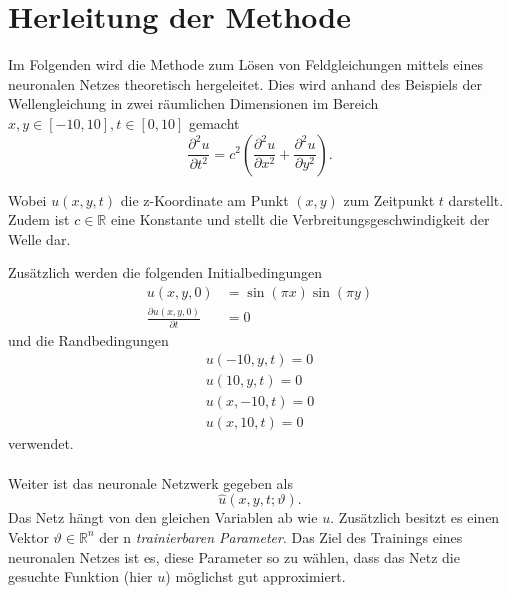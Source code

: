 %
%
%
%

\section{Herleitung der Methode\label{neuronal:section:herleitung}}

Im Folgenden wird die Methode zum Lösen von Feldgleichungen mittels eines neuronalen Netzes theoretisch hergeleitet.
Dies wird anhand des Beispiels der Wellengleichung in zwei räumlichen Dimensionen im Bereich \( x, y \in [-10,10], t \in [0,10] \) gemacht
\begin{equation}
    \frac{\partial^2 u}{\partial t^2} = c^2 \left( \frac{\partial^2 u}{\partial x^2} + \frac{\partial^2 u}{\partial y^2} \right).
    \label{neuronal:wellengleichung}
\end{equation}

Wobei \( u(x, y, t) \) die z-Koordinate am Punkt \( (x, y) \) zum Zeitpunkt \( t \) darstellt. 
Zudem ist \( c \in \mathbb{R} \) eine Konstante und stellt die Verbreitungsgeschwindigkeit der Welle dar.

Zusätzlich werden die folgenden Initialbedingungen
\begin{equation}
    \begin{aligned}
        u(x, y, 0) &= \sin(\pi x) \sin(\pi y)\\
        \frac{\partial u(x, y, 0)}{\partial t} &= 0
    \end{aligned}
    \label{neuronal:initial}
\end{equation}
und die Randbedingungen
\begin{equation}
    \begin{aligned}
        u(-10, y, t) = 0\\
        u(10, y, t) = 0\\
        u(x, -10, t) = 0\\
        u(x, 10, t) = 0
    \end{aligned}
    \label{neuronal:rand}
\end{equation}
verwendet.\\
\\
Weiter ist das neuronale Netzwerk gegeben als
\begin{equation}
    \hat{u}(x, y, t; \vartheta).
    \label{neuronal:nn}
\end{equation}
Das Netz hängt von den gleichen Variablen ab wie \( u \).
Zusätzlich besitzt es einen Vektor \( \vartheta \in \mathbb{R}^n \) der n \emph{trainierbaren Parameter}.
Das Ziel des Trainings eines neuronalen Netzes ist es, diese Parameter so zu wählen, dass das Netz die gesuchte Funktion (hier \( u \)) möglichst gut approximiert.


